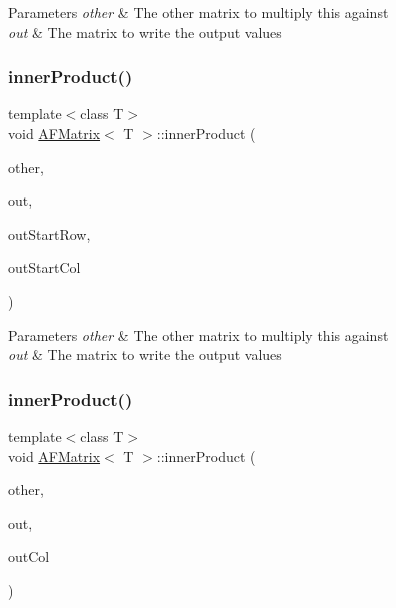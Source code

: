\begin{DoxyParams}{Parameters}
{\em other} & The other matrix to multiply this against \\
\hline
{\em out} & The matrix to write the output values \\
\hline
\end{DoxyParams}
\mbox{\label{classAFMatrix_aef663e647574c6f759bee01f9c017a62}} 
\subsubsection{\texorpdfstring{inner\+Product()}{innerProduct()}\hspace{0.1cm}{\footnotesize\ttfamily [2/4]}}
{\footnotesize\ttfamily template$<$class T$>$ \\
void \hyperlink{classAFMatrix}{A\+F\+Matrix}$<$ T $>$\+::inner\+Product (\begin{DoxyParamCaption}\item[{\hyperlink{classAFMatrix}{A\+F\+Matrix}$<$ T $>$ $\ast$}]{other,  }\item[{\hyperlink{classAFMatrix}{A\+F\+Matrix}$<$ T $>$ $\ast$}]{out,  }\item[{size\+\_\+t}]{out\+Start\+Row,  }\item[{size\+\_\+t}]{out\+Start\+Col }\end{DoxyParamCaption})\hspace{0.3cm}{\ttfamily [inline]}}


\begin{DoxyParams}{Parameters}
{\em other} & The other matrix to multiply this against \\
\hline
{\em out} & The matrix to write the output values \\
\hline
\end{DoxyParams}
\mbox{\label{classAFMatrix_a8563ff2d66c9298a08100fbb11b0217b}} 
\subsubsection{\texorpdfstring{inner\+Product()}{innerProduct()}\hspace{0.1cm}{\footnotesize\ttfamily [3/4]}}
{\footnotesize\ttfamily template$<$class T$>$ \\
void \hyperlink{classAFMatrix}{A\+F\+Matrix}$<$ T $>$\+::inner\+Product (\begin{DoxyParamCaption}\item[{vector$<$ T $>$ $\ast$}]{other,  }\item[{\hyperlink{classAFMatrix}{A\+F\+Matrix}$<$ T $>$ $\ast$}]{out,  }\item[{size\+\_\+t}]{out\+Col }\end{DoxyParamCaption})\hspace{0.3cm}{\ttfamily [inline]}}

